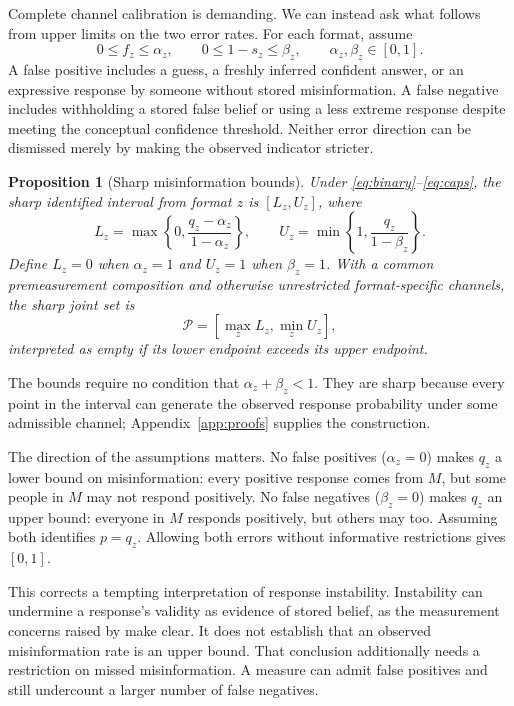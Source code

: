 \documentclass[11pt]{article}
\newtheorem{proposition}{Proposition}
\begin{document}
Complete channel calibration is demanding. We can instead ask what follows from upper limits on the two error rates. For each format, assume
\begin{equation}
 0\le f_z\le\alpha_z,\qquad 0\le1-s_z\le\beta_z,
 \qquad \alpha_z,\beta_z\in[0,1].
 \label{eq:caps}
\end{equation}
A false positive includes a guess, a freshly inferred confident answer, or an expressive response by someone without stored misinformation. A false negative includes withholding a stored false belief or using a less extreme response despite meeting the conceptual confidence threshold. Neither error direction can be dismissed merely by making the observed indicator stricter.

\begin{proposition}[Sharp misinformation bounds]
\label{prop:bounds}
Under \eqref{eq:binary}--\eqref{eq:caps}, the sharp identified interval from format $z$ is $[L_z,U_z]$, where
\begin{equation}
 L_z=\max\left\{0,\frac{q_z-\alpha_z}{1-\alpha_z}\right\},\qquad
 U_z=\min\left\{1,\frac{q_z}{1-\beta_z}\right\}.
 \label{eq:bounds}
\end{equation}
Define $L_z=0$ when $\alpha_z=1$ and $U_z=1$ when $\beta_z=1$. With a common premeasurement composition and otherwise unrestricted format-specific channels, the sharp joint set is
\begin{equation}
 \mathcal P=\left[\max_z L_z,\min_z U_z\right],
 \label{eq:joint}
\end{equation}
interpreted as empty if its lower endpoint exceeds its upper endpoint.
\end{proposition}

The bounds require no condition that $\alpha_z+\beta_z<1$. They are sharp because every point in the interval can generate the observed response probability under some admissible channel; Appendix~\ref{app:proofs} supplies the construction.

The direction of the assumptions matters. No false positives ($\alpha_z=0$) makes $q_z$ a lower bound on misinformation: every positive response comes from $M$, but some people in $M$ may not respond positively. No false negatives ($\beta_z=0$) makes $q_z$ an upper bound: everyone in $M$ responds positively, but others may too. Assuming both identifies $p=q_z$. Allowing both errors without informative restrictions gives $[0,1]$.

This corrects a tempting interpretation of response instability. Instability can undermine a response's validity as evidence of stored belief, as the measurement concerns raised by \citet{graham2023} make clear. It does not establish that an observed misinformation rate is an upper bound. That conclusion additionally needs a restriction on missed misinformation. A measure can admit false positives and still undercount a larger number of false negatives.
\end{document}

